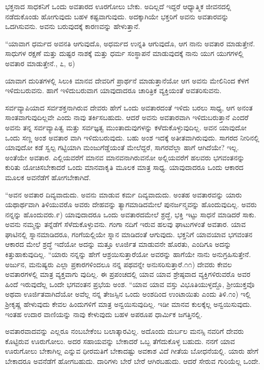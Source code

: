 ಭಕ್ತನಾದ ಸಾಧಕನಿಗೆ ಒಂದು ಅವತಾರದ ಊರಗೋಲು ಬೇಕು. ಅದಿಲ್ಲದೆ ಇದ್ದರೆ ಆಧ್ಯಾತ್ಮಿಕ ಜೀವನದಲ್ಲಿ ನಡೆದುಕೊಂಡು ಹೋಗುವುದು ಬಹಳ ಕಷ್ಟವಾಗುವುದು. ಅದಕ್ಕಾಗಿಯೇ ಭಕ್ತರಿಗೆ ಅವನು ಅವತಾರವನ್ನು ಒದಗಿಸುವನು. ಅವನು ಬರುವುದಕ್ಕೆ ಕಾರಣವನ್ನು ಹೇಳುತ್ತಾನೆ.

“ಯಾವಾಗ ಧರ್ಮದ ಅವನತಿ ಆಗುವುದೊ, ಅಧರ್ಮದ ಉನ್ನತಿ ಆಗುವುದೊ, ಆಗ ನಾನು ಅವತಾರ ಮಾಡುತ್ತೇನೆ. ಸಾಧುಗಳ ರಕ್ಷಣೆ ಮತ್ತು ದುಷ್ಟರ ನಾಶಕ್ಕೆ ಮತ್ತು ಧರ್ಮ ಸಂಸ್ಥಾಪನೆ ಮಾಡುವುದಕ್ಕೆ ನಾನು ಯುಗ ಯುಗಗಳಲ್ಲಿ ಅವತಾರ ಮಾಡುತ್ತೇನೆ., ೭, ೮)

ಯಾವಾಗ ದುರಿತಗಳಲ್ಲಿ ಸಿಲುಕಿ ಮಾನವ ದೇವರಿಗೆ ಪ್ರಾರ್ಥನೆ ಮಾಡುತ್ತಾನೆಯೋ ಆಗ ಅವನು ಮೇಲಿನಿಂದ ಕೆಳಗೆ ಇಳಿದುಬರುವನು. ಹಾಗೆ ಇಳಿದುಬರುವಾಗ ಯಾವುದಾದರೂ ಚಾರಿತ್ರಿಕ ವ್ಯಕ್ತಿಯಂತೆ ಅವತರಿಸುವನು.

ಸರ್ವವ್ಯಾಪಿಯಾದ ಸರ್ವಶಕ್ತನಾಗಿರುವ ದೇವರು ಹೇಗೆ ಒಂದು ಅವತಾರದಂತೆ ಇಳಿದು ಬರಲು ಸಾಧ್ಯ, ಆಗ ಅನಂತ ಸಾಂತವಾಗುವುದಿಲ್ಲವೇ ಎಂದು ನಾವು ತರ್ಕಿಸಬಹುದು. ಆದರೆ ಅವನು ಅವತಾರವಾಗಿ ಇಳಿದುಬರುತ್ತಾನೆ ಎಂದರೆ ಅವನು ತನ್ನ ಸರ್ವವ್ಯಾಪಿತ್ವ ಮತ್ತು ಸರ್ವಜ್ಞತ್ವ ಮುಂತಾದುವುಗಳನ್ನು ಕಳೆದುಕೊಳ್ಳುವುದಿಲ್ಲ. ಅವನ ಯಾವುದೋ ಒಂದು ಸಣ್ಣ ಅಂಶ ಅವತಾರ ವಾಗಿ ಇಳಿದುಬರುವುದು. ಬಹು ಅಂಶ ಇದಕ್ಕೆ ಅತೀತವಾಗಿರುವುದು. ಸಾಗರದ ನೀರಿನಲ್ಲಿ ಯಾವುದೋ ಕಡೆ ಸ್ವಲ್ಪ ಗಟ್ಟಿಯಾಗಿ ಮಂಜುಗೆಡ್ಡೆಯಂತೆ ಮೇಲೆದ್ದರೆ, ಸಾಗರವೆಲ್ಲಾ ಹಾಗೆ ಆಗಿದೆಯೇ? ಇಲ್ಲ. ಅಂತೆಯೇ ಅವತಾರ. ಎಲ್ಲಿಯವರೆಗೆ ಮಾನವ ಮಾನವನಾಗಿರುವನೋ ಅಲ್ಲಿಯವರೆಗೆ ಹಲವರು ಭಗವಂತನನ್ನು ಕುರಿತು ಯೋಚಿಸಬೇಕಾದರೆ ಒಂದು ಮಾನವಾಕೃತಿ ಮೂಲಕ ಮಾತ್ರ ಸಾಧ್ಯ. ಯಾವುದಾದರೂ ಒಂದು ಆಕಾರದ ಮೂಲಕ ಅವನೆಡೆಗೆ ಹೋಗಬೇಕಾಗಿದೆ.

“ಅವನ ಅವತಾರ ದಿವ್ಯವಾದುದು. ಅವನು ಮಾಡುವ ಕರ್ಮ ದಿವ್ಯವಾದುದು. ಅಂತಹ ಅವತಾರವನ್ನು ಯಾರು ಯಥಾರ್ಥವಾಗಿ ತಿಳಿಯುವರೊ ಅವರು ದೇಹವನ್ನು ತ್ಯಾಗಮಾಡಿದಮೇಲೆ ಪುನರ್ಜನ್ಮವನ್ನು ಹೊಂದುವುದಿಲ್ಲ. ಅವರು ನನ್ನನ್ನು ಹೊಂದುವರು.೯) ಯಾವುದಾದರೂ ಒಂದು ಅವತಾರದಮೇಲೆ ಶ್ರದ್ಧೆ, ಭಕ್ತಿ ಇಟ್ಟು ಸಾಧನೆ ಮಾಡಿದರೆ ಸಾಕು. ಅವನು ನಮ್ಮನ್ನು ತನ್ನೆಡೆಗೆ ಸೆಳೆದುಕೊಳ್ಳುವನು. ಗಂಗಾ ನದಿಗೆ ಇರುವ ಹಲವು ಘಾಟುಗಳಂತೆ ಅವತಾರ. ಯಾವ ಘಾಟಿನಲ್ಲಿ ಸ್ನಾನಮಾಡಿದರೂ, ಗಂಗೆಯಲ್ಲಿಯೇ ಸ್ನಾನ ಮಾಡಿದಂತೆ ಆಗುವುದು. ಭಕ್ತನಿಗೆ ಯಾವಯಾವ ಭಗವಂತನ ಆಕಾರದ ಮೇಲೆ ಶ್ರದ್ಧೆ ಇದೆಯೋ ಅದನ್ನು ಮತ್ತೂ ಊರ್ಜಿತ ಮಾಡುವನೇ ಹೊರತು, ಎಂದಿಗೂ ಅದನ್ನು ಕಿತ್ತುಹಾಕುವುದಿಲ್ಲ. “ಯಾರು ನನ್ನನ್ನು ಹೇಗೆ ಆಶ್ರಯಿಸುತ್ತಾರೆಯೋ ಅವರನ್ನು ಹಾಗೆಯೇ ನಾನು ಅನುಗ್ರಹಿಸುತ್ತೇನೆ. ಅರ್ಜುನ, ಮನುಷ್ಯರು ಎಲ್ಲಾ ಪ್ರಕಾರಗಳಿಂದಲೂ ನನ್ನ ಪಥವನ್ನೇ ಅನುಸರಿಸುತ್ತಾರೆ.೧೧) ದೇವರು ಕೇವಲ ಅವತಾರಗಳಲ್ಲಿ ಮಾತ್ರ ವ್ಯಕ್ತವಾಗು ವುದಿಲ್ಲ. ಈ ಪ್ರಪಂಚದಲ್ಲಿ ಯಾವ ಯಾವ ಶ್ರೇಷ್ಠವಾದ ವ್ಯಕ್ತಿಗಳಿರುವರೊ ಅವರ ಹಿಂದೆ ಇರುವುದೆಲ್ಲ ಒಂದೇ ಭಗವಂತನ ಪ್ರಭೆಯ ಅಂಶ. “ಯಾವ ಯಾವ ವಸ್ತು ವಿಭೂತಿಯುಳ್ಳದ್ದೊ, ಶ್ರೀಯುಕ್ತವೊ ಅಥವಾ ಊರ್ಜಿತವಾಗಿದೆಯೋ ಅವೆಲ್ಲ ನನ್ನ ತೇಜಸ್ಸಿನ ಒಂದು ಅಂಶದಿಂದ ಉಂಟಾಯಿತು ಎಂದು ತಿಳಿ.೧ಂ) ಇಲ್ಲಿ ಶ್ರೀಕೃಷ್ಣ ಹೇಳುವುದು ಕೇವಲ ಹಿಂದುಗಳಿಗೆ ಮಾತ್ರ ಅನ್ವಯಿಸುವುದಿಲ್ಲ. ಇಡೀ ಮಾನವ ಕುಲಕ್ಕೆಲ್ಲ ಅನ್ವಯಿಸುವುದು. ಇಂತಹ ಉದಾರ ವಾಣಿಯನ್ನು ನಾವು ಕೇಳುವುದು ಬಹಳ ಅಪರೂಪ ಧಾರ್ಮಿಕ ಜಗತ್ತಿನಲ್ಲಿ.

ಅವತಾರವಾದವನ್ನು ಎಲ್ಲರೂ ನಂಬಬೇಕೆಂಬ ಬಲಾತ್ಕಾರವಿಲ್ಲ. ಅದೊಂದು ದುರ್ಬಲ ಮನಸ್ಸಿ ನವರಿಗೆ ದೇವರು ಕೊಟ್ಟಿರುವ ಊರುಗೋಲು. ಅದರ ಸಹಾಯವನ್ನು ಬೇಕಾದರೆ ಒಬ್ಬ ತೆಗೆದುಕೊಳ್ಳ ಬಹುದು. ನನಗೆ ಯಾವ ಊರುಗೋಲು ಬೇಕಾಗಿಲ್ಲ ಎನ್ನುವ ಧೀರಮತಿಗೆ ಬೇಕಾದಷ್ಟು ಅವಕಾಶ ವಿದೆ ಗೀತೆಯ ಬೋಧನೆಯಲ್ಲಿ. ಯಾರು ಹೇಗೆ ಬೇಕಾದರೂ ಅವನೆಡೆಗೆ ಹೋಗಬಹುದು. ದಾರಿಗಳು ಬೇರೆ ಬೇರೆ ಆಗಿರಬಹುದು. ಆದರೆ ಸೇರುವ ಗುರಿಯೆಲ್ಲ ಒಂದೇ.


